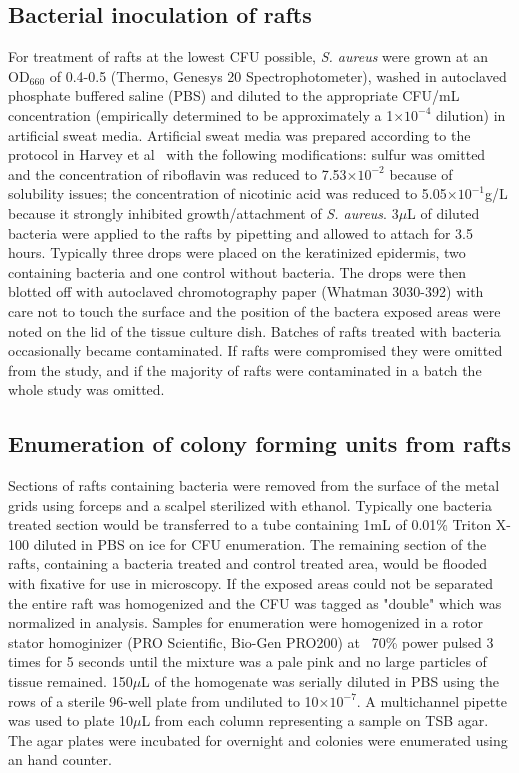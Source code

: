 \documentclass[10pt,letterpaper]{article}
\providecommand{\e}[1]{\ensuremath{\times 10^{#1}}}
\begin{document}
\subsection*{Bacterial inoculation of rafts}
For treatment of rafts at the lowest CFU possible, \textit{S. aureus} were grown at an OD$_{660}$ of 0.4-0.5 (Thermo, Genesys 20 Spectrophotometer), washed in autoclaved phosphate buffered saline (PBS) and diluted to the appropriate CFU/mL concentration (empirically determined to be approximately a 1\e{-4} dilution) in artificial sweat media.
Artificial sweat media was prepared according to the protocol in Harvey et al~\cite{harvey_formulation_2010} with the following modifications:
sulfur was omitted and the concentration of riboflavin was reduced to 7.53\e{-2} because of solubility issues;
the concentration of nicotinic acid was reduced to 5.05\e{-1}g/L because it strongly inhibited growth/attachment of \textit{S. aureus}.
3$\mu$L of diluted bacteria were applied to the rafts by pipetting and allowed to attach for 3.5 hours.
Typically three drops were placed on the keratinized epidermis, two containing bacteria and one control without bacteria.
The drops were then blotted off with autoclaved chromotography paper (Whatman 3030-392) with care not to touch the surface and the position of the bactera exposed areas were noted on the lid of the tissue culture dish.
Batches of rafts treated with bacteria occasionally became contaminated.
If rafts were compromised they were omitted from the study, and if the majority of rafts were contaminated in a batch the whole study was omitted.

\subsection*{Enumeration of colony forming units from rafts}
Sections of rafts containing bacteria were removed from the surface of the metal grids using forceps and a scalpel sterilized with ethanol.
Typically one bacteria treated section would be transferred to a tube containing 1mL of 0.01\% Triton X-100 diluted in PBS on ice for CFU enumeration.
The remaining section of the rafts, containing a bacteria treated and control treated area, would be flooded with fixative for use in microscopy.
If the exposed areas could not be separated the entire raft was homogenized and the CFU was tagged as "double" which was normalized in analysis. 
Samples for enumeration were homogenized in a rotor stator homoginizer (PRO Scientific, Bio-Gen PRO200) at ~70\% power pulsed 3 times for 5 seconds until the mixture was a pale pink and no large particles of tissue remained.
150$\mu$L of the homogenate was serially diluted in PBS using the rows of a sterile 96-well plate from undiluted to 10\e{-7}.
A multichannel pipette was used to plate 10$\mu$L from each column representing a sample on TSB agar.
The agar plates were incubated for overnight and colonies were enumerated using an hand counter.
\end{document}
